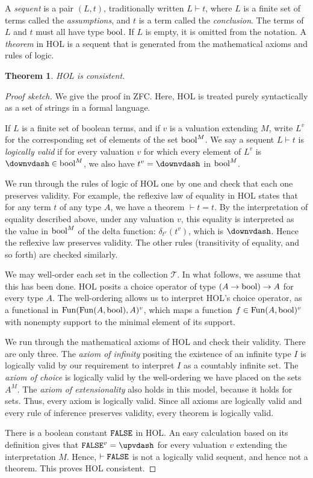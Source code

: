 \documentclass[brochure,english,12pt]{bourbaki}
\theoremstyle{plain}
\newtheorem{theorem}[equation]{Theorem}
\def\op#1{{\operatorname{#1}}}
\def\T{{\mathcal T}}
\begin{document}
A {\it sequent} is a pair $(L,t)$, traditionally written $L\vdash t$, where $L$ is a finite set of terms
called the {\it assumptions}, and $t$ is a term called the {\it conclusion}.  The
terms of $L$ and $t$ must all have type $\bool$.   If $L$ is empty, it is omitted from the
notation.  A {\it theorem} in HOL is a sequent that is generated from the mathematical axioms
and rules of logic.  

\begin{theorem} HOL is consistent.
\end{theorem}

\begin{proof}[Proof sketch]
We give the proof in ZFC.  Here, HOL is treated purely syntactically as a set of strings in 
a formal language.

If $L$ is a finite set of boolean terms, and if $v$ is a valuation extending $M$,  
write $L^{v}$ for the corresponding set of elements of the set $\bool^M$.
We say a sequent $L \vdash t$ is {\it logically valid}
if for every valuation $v$ for which every element of $L^{v}$ is $\downvdash \in \bool^M$, we also have
$t^{v}=\downvdash $ in $\bool^M$.

We run through the rules of logic of HOL one by one and check that each one preserves
validity.  For example, the reflexive law of equality in HOL states that for any term $t$
of any type $A$, we have a theorem $\vdash t = t$.  By the interpretation of equality described above, under
any valuation $v$, this equality is interpreted as the value in $\bool^M$ of the delta function: 
$\delta_{t^{v}}(t^{v})$, which is $\downvdash $.  Hence the reflexive law preserves validity.
The other rules (transitivity of equality, and so forth) are checked similarly.

We may well-order
 each set in the collection $\T$. In what follows, we 
assume that this
has been done.  HOL posits a choice operator of type $(A\to\bool)\to A$ for every type $A$.  The well-ordering  
allows us to 
interpret HOL's choice operator, as a functional
in $\Fun(\Fun(A,\bool),A)^{v}$, 
which maps a function $f\in \Fun(A,\bool)^{v}$ with nonempty support to
the minimal element of its support.

We run through the mathematical axioms of HOL and check their validity. 
There are only three.  The {\it axiom
of infinity} positing the existence of an infinite type $I$
is logically valid by our requirement to interpret $I$ as a countably infinite set.  The {\it axiom of
choice} is logically valid by the well-ordering we have placed on the sets $A^M$.  The {\it axiom
of extensionality} also holds in this model, because it holds for sets.
Thus, every axiom is logically valid.  
Since all axioms are logically valid and every rule of inference
preserves validity, every theorem is logically valid.

There is a boolean constant $\op{\tt FALSE}$ in HOL.
An easy calculation based on its definition gives that $\op{\tt FALSE}^v = \upvdash$ for every valuation $v$
extending the interpretation $M$.  Hence,
$\vdash \op{\tt FALSE}$ is not a logically valid sequent, and hence not a theorem.
This proves HOL consistent.
\end{proof}
\end{document}
